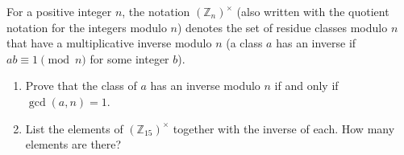 For a positive integer $n$, the notation $(\mathbb Z_n)^\times$ (also written with the quotient notation for the integers modulo $n$) denotes the set of residue classes modulo $n$ that have a multiplicative inverse modulo $n$ (a class $a$ has an inverse if $ab\equiv1\pmod n$ for some integer $b$).
\begin{enumerate}
\item[(a)] Prove that the class of $a$ has an inverse modulo $n$ if and only if $\gcd(a,n)=1$.
\item[(b)] List the elements of $(\mathbb Z_{15})^\times$ together with the inverse of each. How many elements are there?
\end{enumerate}
